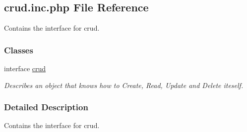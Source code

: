 \hypertarget{crud_8inc_8php}{\subsection{crud.\-inc.\-php File Reference}
\label{crud_8inc_8php}
}


Contains the interface for crud.  


\subsubsection*{Classes}
\begin{DoxyCompactItemize}
\item 
interface \hyperlink{interfacecrud}{crud}
\begin{DoxyCompactList}\small\item\em Describes an object that knows how to Create, Read, Update and Delete iteself. \end{DoxyCompactList}\end{DoxyCompactItemize}


\subsubsection{Detailed Description}
Contains the interface for crud. 